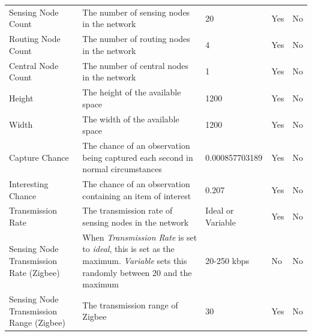 \begin{landscape}
\begin{table}
\begin{tabularx}{\textwidth}{|p{4cm}|p{10cm}|p{3cm}|p{2cm}|p{2cm}|}
	Sensing Node Count                      & The number of sensing nodes in the network                                                                                  & 20                  & Yes                & No                 \\
	Routing Node Count                      & The number of routing nodes in the network                                                                                  & 4                   & Yes                & No                 \\
	Central Node Count                      & The number of central nodes in the network                                                                                  & 1                   & Yes                & No                 \\
	Height                                  & The height of the available space                                                                                           & 1200                & Yes                & No                 \\
	Width                                   & The width of the available space                                                                                            & 1200                & Yes                & No                 \\
	Capture Chance                          & The chance of an observation being captured each second in normal circumstances                                             & 0.000857703189      & Yes                & No                 \\
	Interesting Chance                      & The chance of an observation containing an item of interest                                                                 & 0.207               & Yes                & No                 \\
	Transmission Rate                       & The transmission rate of sensing nodes in the network                                                                       & Ideal or Variable   & Yes                & No                 \\
	Sensing Node Transmission Rate (Zigbee) & When \textit{Transmission Rate} is set to \textit{ideal}, this is set as the maximum. \textit{Variable} sets this randomly between 20 and the maximum & 20-250 kbps         & No                 & No                 \\
	Sensing Node Transmission Range (Zigbee)& The transmission range of Zigbee                                                                                            & 30                  & Yes                & No                 \\

\end{tabularx}
\end{table}
\end{landscape}
